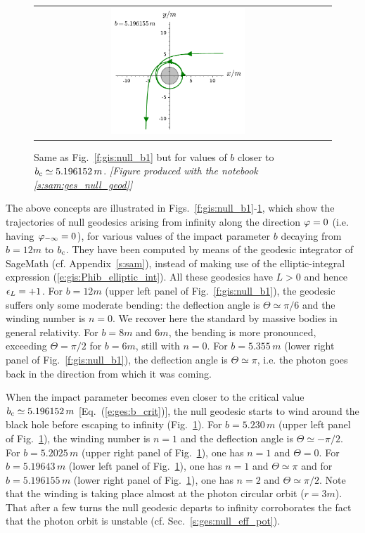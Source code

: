 \begin{figure}
\begin{tabular}{cc}
\includegraphics[width=0.48\textwidth]{ges_null_b_5_196155.pdf}
\end{tabular}
\caption[]{\label{f:gis:null_b2} \footnotesize
Same as Fig.~\ref{f:gis:null_b1} but for values of $b$ closer to
$b_{\rm c} \simeq 5.196152\, m$.
\textsl{[Figure produced with the notebook \ref{s:sam:ges_null_geod}]}
}
\end{figure}

The above concepts are illustrated in Figs.~\ref{f:gis:null_b1}-\ref{f:gis:null_b2},
which show the trajectories
of null geodesics arising from infinity along the
direction $\varphi=0$ (i.e. having $\varphi_{-\infty}=0$), for various values of the
impact parameter $b$ decaying from $b=12 m$ to $b_{\rm c}$.
They have been computed by means of the geodesic integrator
of \textsf{SageMath} (cf. Appendix~\ref{s:sam}), instead of making use
of the elliptic-integral expression (\ref{e:gis:Phib_elliptic_int}).
All these geodesics have $L>0$ and hence $\epsilon_L = +1$.
For $b=12 m$ (upper left panel of Fig.~\ref{f:gis:null_b1}),
the geodesic suffers only some moderate bending: the deflection angle is
$\Theta\simeq \pi/6$ and the winding number is $n=0$.
We recover here the standard
 by massive bodies in
general relativity.
For $b=8 m$ and $6 m$, the bending is more pronounced,
exceeding $\Theta = \pi/2$ for $b=6 m$, still with $n=0$. For $b=5.355\, m$ (lower right panel of Fig.~\ref{f:gis:null_b1}), the deflection angle is $\Theta\simeq\pi$, i.e. the photon goes back in the direction
from which it was coming.

When the impact parameter becomes even closer to the critical value
$b_{\rm c}\simeq 5.196152\, m$ [Eq.~(\ref{e:ges:b_crit})],
the null geodesic starts to wind around the black hole before escaping
to infinity (Fig.~\ref{f:gis:null_b2}).
For $b=5.230\, m$ (upper left panel of Fig.~\ref{f:gis:null_b2}), the winding
number is
$n=1$ and the deflection angle is $\Theta\simeq -\pi/2$.
For $b=5.2025\, m$ (upper right panel of Fig.~\ref{f:gis:null_b2}), one has
$n=1$ and $\Theta=0$. For $b=5.19643\, m$ (lower left panel
of Fig.~\ref{f:gis:null_b2}), one has
$n=1$ and $\Theta\simeq \pi$ and for $b=5.196155\, m$ (lower right panel of Fig.~\ref{f:gis:null_b2}), one has $n=2$ and
$\Theta\simeq \pi/2$.
Note that the winding is taking place
almost at the photon circular orbit ($r=3m$). That after a few turns the null geodesic
departs to infinity corroborates the fact that the photon orbit is unstable
(cf. Sec.~\ref{s:ges:null_eff_pot}).

